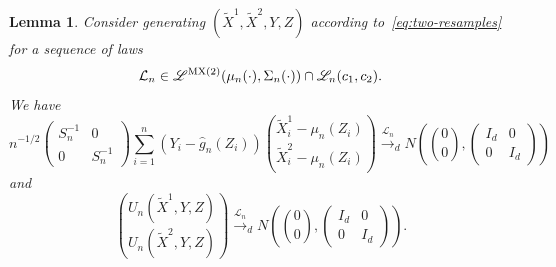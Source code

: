 \documentclass[12pt]{article}
\newtheorem{lemma}{Lemma}
\theoremstyle{definition}
\theoremstyle{remark}
\newcommand{\srz}{Z}
\newcommand{\srxk}{\widetilde X}
\newcommand{\sry}{Y}
\begin{document}
\begin{lemma}\label{lem:clt}
	Consider generating $(\srxk^1, \srxk^2, \sry, \srz)$ according to~\eqref{eq:two-resamples} for a sequence of laws
	\begin{equation}
		\mathcal L_n \in \mathscr L^{\textnormal{MX(2)}}(\mu_n(\cdot), \Sigma_n(\cdot)) \cap \mathscr L_n(c_1, c_2).
	\end{equation}
	We have 
	\begin{equation}
		n^{-1/2}
		\begin{pmatrix}
			S_n^{-1} & 0 \\
			0 & S_n^{-1}
		\end{pmatrix}\sum_{i = 1}^n (\sry_{i} - \widehat g_n(\srz_{i})){\srxk^1_{i} - \mu_n(\srz_i) \choose \srxk^2_{i} - \mu_n(\srz_i)} \overset{\mathcal L_n}\rightarrow_d N\left({0 \choose 0}, \begin{pmatrix}
			I_d & 0 \\
			0 & I_d
		\end{pmatrix}
		\right)
		\label{convergence-1}
	\end{equation}
	and
	\begin{equation}
		{U_n(\srxk^1, \sry, \srz) \choose U_n(\srxk^2, \sry, \srz)} \overset{\mathcal L_n}\rightarrow_d N\left({0 \choose 0},
		\begin{pmatrix}
			I_d & 0 \\
			0 & I_d
		\end{pmatrix}
		\right).
		\label{convergence-2}
	\end{equation}
\end{lemma}
\end{document}
